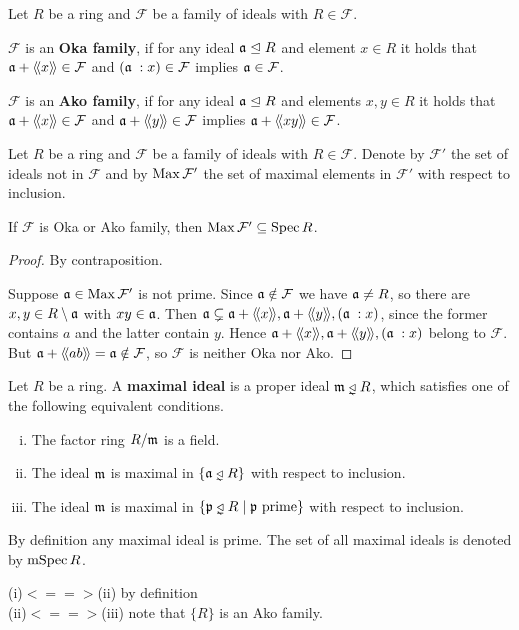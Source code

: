 	\begin{definition}
		Let $R$ be a ring and $\mathcal{F}$ be a family of ideals with $R \in \mathcal{F}$.

		$\mathcal{F}$ is an \textbf{Oka family}, if for any ideal $\mathfrak{a} \trianglelefteq R$ and element $x \in R$ it holds that $\mathfrak{a} + \langle\!\langle x \rangle\!\rangle \in \mathcal{F}$ and $(\mathfrak{a}\;:x) \in \mathcal{F}$ implies $\mathfrak{a} \in \mathcal{F}$.

		$\mathcal{F}$ is an \textbf{Ako family}, if for any ideal $\mathfrak{a} \trianglelefteq R$ and elements $x,y \in R$ it holds that $\mathfrak{a} + \langle\!\langle x \rangle\!\rangle \in \mathcal{F}$ and $\mathfrak{a} + \langle\!\langle y \rangle\!\rangle \in \mathcal{F}$ implies $\mathfrak{a} + \langle\!\langle xy \rangle\!\rangle \in \mathcal{F}$.
	\end{definition}

	\begin{lemma}
		Let $R$ be a ring and $\mathcal{F}$ be a family of ideals with $R \in \mathcal{F}$. Denote by $\mathcal{F}'$ the set of ideals not in $\mathcal{F}$ and by $\operatorname{Max} \mathcal{F}'$ the set of maximal elements in $\mathcal{F}'$ with respect to inclusion.

		If $\mathcal{F}$ is Oka or Ako family, then $\operatorname{Max} \mathcal{F}' \subseteq \operatorname{Spec} R$.
	\end{lemma}
	\begin{proof}
		By contraposition.

		Suppose $\mathfrak{a} \in \operatorname{Max}\mathcal{F}'$ is not prime. Since $\mathfrak{a} \notin \mathcal{F}$ we have $\mathfrak{a} \neq R$, so there are $x,y \in R\setminus \mathfrak{a}$ with $xy \in \mathfrak{a}$. Then $\mathfrak{a} \subsetneq \mathfrak{a} + \langle\!\langle x \rangle\!\rangle, \mathfrak{a}+\langle\!\langle y \rangle\!\rangle, (\mathfrak{a}\;:x)$, since the former contains $a$ and the latter contain $y$. Hence $\mathfrak{a} + \langle\!\langle x \rangle\!\rangle, \mathfrak{a}+\langle\!\langle y \rangle\!\rangle, (\mathfrak{a}\;:x)$ belong to $\mathcal{F}$. But $\mathfrak{a}+\langle\!\langle ab \rangle\!\rangle = \mathfrak{a} \notin \mathcal{F}$, so $\mathcal{F}$ is neither Oka nor Ako.
	\end{proof}

	\begin{definition}
		Let $R$ be a ring. A \textbf{maximal ideal} is a proper ideal $\ideal{m} \divneq R$, which satisfies one of the following equivalent conditions.
		\begin{enumerate}[(i)]
			\item{
				The factor ring $R/\mathfrak{m}$ is a field.
			}
			\item{
				The ideal $\mathfrak{m}$ is maximal in $\{\ideal{a} \divneq R\}$ with respect to inclusion.
			}
			\item{
				The ideal $\mathfrak{m}$ is maximal in $\{\ideal{p} \divneq R \mid \ideal{p} \text{ prime}\}$ with respect to inclusion.
			}
		\end{enumerate}
		By definition any maximal ideal is prime. The set of all maximal ideals is denoted by $\operatorname{mSpec} R$.
	\end{definition}
	\begin{sketch}
		(i)$<==>$(ii) by definition\\
		(ii)$<==>$(iii) note that $\{R\}$ is an Ako family.
	\end{sketch}

